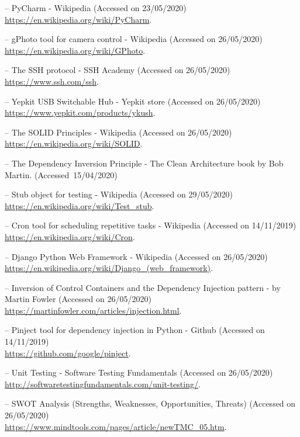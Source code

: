 \begin{thebibliography}{99999}
\singlespace\normalsize

 -- PyCharm - Wikipedia (Accessed on 23/05/2020)\\ \url{https://en.wikipedia.org/wiki/PyCharm}.

 -- gPhoto tool for camera control - Wikipedia (Accessed on 26/05/2020) \\ \url{https://en.wikipedia.org/wiki/GPhoto}.

 -- The SSH protocol - SSH Academy (Accessed on 26/05/2020) \\ \url{https://www.ssh.com/ssh}.

 -- Yepkit USB Switchable Hub - Yepkit store (Accessed on 26/05/2020) \\ \url{https://www.yepkit.com/products/ykush}.

 -- The SOLID Principles - Wikipedia (Accessed on 26/05/2020) \\ \url{https://en.wikipedia.org/wiki/SOLID}. 

 -- The Dependency Inversion Principle - The Clean Architecture book by Bob Martin. \mbox{(Accessed 15/04/2020)}

 -- Stub object for testing - Wikipedia (Accessed on 29/05/2020) \\ \url{https://en.wikipedia.org/wiki/Test_stub}. 

 -- Cron tool for scheduling repetitive tasks - Wikipedia (Accessed on 14/11/2019) \\ \url{https://en.wikipedia.org/wiki/Cron}.

 -- Django Python Web Framework - Wikipedia (Accessed on 26/05/2020) \\ \url{https://en.wikipedia.org/wiki/Django_(web_framework)}. 

 -- Inversion of Control Containers and the Dependency Injection pattern - by Martin Fowler (Accessed on 26/05/2020) \\ \url{https://martinfowler.com/articles/injection.html}. 

 -- Pinject tool for dependency injection in Python - Github (Accessed on 14/11/2019) \\ \url{https://github.com/google/pinject}. 

 -- Unit Testing - Software Testing Fundamentals (Accessed on 26/05/2020)\\\url{http://softwaretestingfundamentals.com/unit-testing/}.

 -- SWOT Analysis (Strengths, Weaknesses, Opportunities, Threats) (Accessed on 26/05/2020) \\ \url{https://www.mindtools.com/pages/article/newTMC_05.htm}.

\end{thebibliography}
